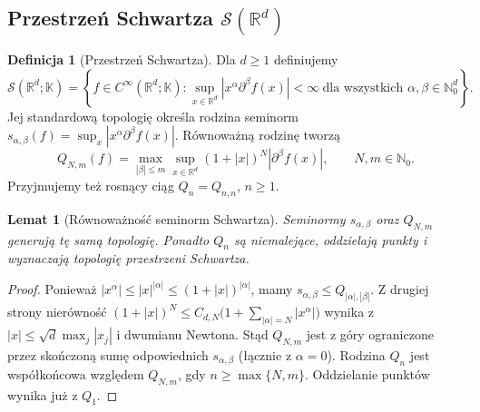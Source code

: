 \documentclass[11pt,a4paper]{article}
\numberwithin{equation}{section}
\theoremstyle{plain}
\newtheorem{lemat}[twierdzenie]{Lemat}
\theoremstyle{definition}
\newtheorem{definicja}[twierdzenie]{Definicja}
\theoremstyle{remark}
\newcommand{\R}{\mathbb R}
\newcommand{\N}{\mathbb N}
\newcommand{\K}{\mathbb K}
\begin{document}
\subsection{Przestrzeń Schwartza \texorpdfstring{$\mathcal S(\R^d)$}{S(Rd)}}

\begin{definicja}[Przestrzeń Schwartza]
\label{def:schwartz17}
Dla $d\ge1$ definiujemy
\[
\mathcal S(\R^d;\K)=\left\{f\in C^\infty(\R^d;\K):
\sup_{x\in\R^d}|x^\alpha\partial^\beta f(x)|<\infty
\ \text{dla wszystkich }\alpha,\beta\in\N_0^d\right\}.
\]
Jej standardową topologię określa rodzina seminorm
$s_{\alpha,\beta}(f)=\sup_x|x^\alpha\partial^\beta f(x)|$.
Równoważną rodzinę tworzą
\[
 Q_{N,m}(f)=\max_{|\beta|\le m}\sup_{x\in\R^d}
 (1+|x|)^N|\partial^\beta f(x)|,
 \qquad N,m\in\N_0.
\]
Przyjmujemy też rosnący ciąg $Q_n=Q_{n,n}$, $n\ge1$.
\end{definicja}

\begin{lemat}[Równoważność seminorm Schwartza]
\label{lem:schwartz-seminorms17}
Seminormy $s_{\alpha,\beta}$ oraz $Q_{N,m}$ generują tę samą
topologię. Ponadto $Q_n$ są niemalejące, oddzielają punkty
i wyznaczają topologię przestrzeni Schwartza.
\end{lemat}
\begin{proof}
Ponieważ $|x^\alpha|\le |x|^{|\alpha|}\le(1+|x|)^{|\alpha|}$,
mamy $s_{\alpha,\beta}\le Q_{|\alpha|,|\beta|}$.
Z drugiej strony nierówność
$(1+|x|)^N\le C_{d,N}\bigl(1+\sum_{|\alpha|=N}|x^\alpha|\bigr)$
wynika z $|x|\le\sqrt d\max_j|x_j|$ i dwumianu Newtona.
Stąd $Q_{N,m}$ jest z góry ograniczone przez skończoną
sumę odpowiednich $s_{\alpha,\beta}$ (łącznie z $\alpha=0$).
Rodzina $Q_n$ jest współkońcowa względem $Q_{N,m}$,
gdy $n\ge\max\{N,m\}$. Oddzielanie punktów wynika już z $Q_1$.
\end{proof}
\end{document}
